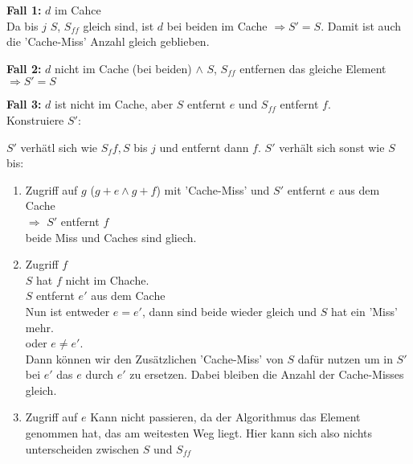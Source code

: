 \begin{description}
\begin{description}
\item{\bfseries Fall 1:} $d$ im Cahce\\
Da bis $j$ $S$, $S_{ff}$ gleich sind, ist $d$ bei beiden im Cache $\Rightarrow S' = S$. Damit ist auch die 'Cache-Miss' Anzahl gleich geblieben.

\item{\bfseries Fall 2:} $d$ nicht im Cache (bei beiden) $\land$ $S$, $S_{ff}$ entfernen das gleiche Element $\Rightarrow S'=S$

\item{\bfseries Fall 3:} $d$ ist nicht im Cache, aber $S$ entfernt $e$ und $S_{ff}$ entfernt $f$.\\

Konstruiere $S'$:

$S'$ verhätl sich wie $S_ff, S$ bis $j$ und entfernt dann $f$. $S'$ verhält sich sonst wie $S$ bis:

\begin{enumerate}[\bfseries (1)]

\item Zugriff auf $g$ ($g+e \land g + f$) mit 'Cache-Miss' und $S'$ entfernt $e$ aus dem Cache\\
$\Rightarrow$ $S'$ entfernt $f$\\
beide Miss und Caches sind gliech.

\item Zugriff $f$\\
$S$ hat $f$ nicht im Chache.\\
$S$ entfernt $e'$ aus dem Cache\\
Nun ist entweder $e = e'$, dann sind beide wieder gleich und $S$ hat ein 'Miss' mehr.\\
oder $e \not= e'$.\\
Dann können wir den Zusätzlichen 'Cache-Miss' von $S$ dafür nutzen um in $S'$ bei $e'$ das $e$ durch $e'$ zu ersetzen. Dabei bleiben die Anzahl der Cache-Misses gleich.

\item Zugriff auf $e$
Kann nicht passieren, da der Algorithmus das Element genommen hat, das am weitesten Weg liegt. Hier kann sich also nichts unterscheiden zwischen $S$ und $S_{ff}$

\end{enumerate}

\end{description}

\end{description}